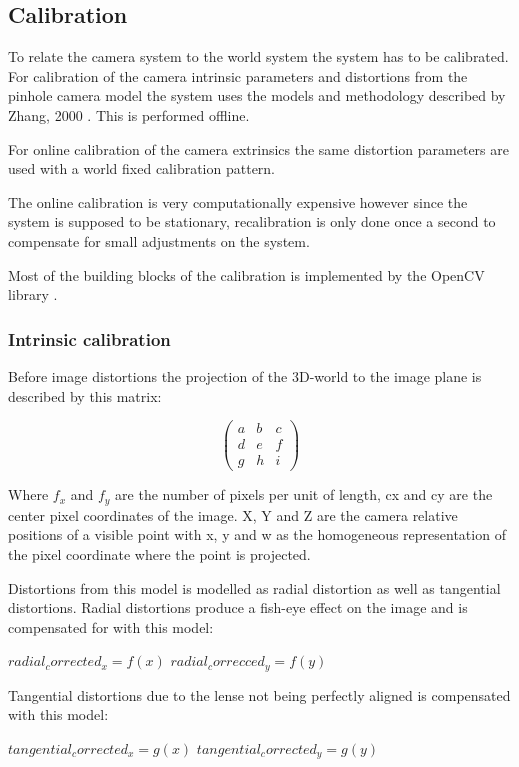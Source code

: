 
\subsection{Calibration}
To relate the camera system to the world system the system has to be calibrated. For calibration of the camera intrinsic parameters and distortions from the pinhole camera model the system uses the models and methodology described by Zhang, 2000 \cite{zhang}. This is performed offline.

For online calibration of the camera extrinsics the same distortion parameters are used with a world fixed calibration pattern.

The online calibration is very computationally expensive however since the system is supposed to be stationary, recalibration is only done once a second to compensate for small adjustments on the system.

Most of the building blocks of the calibration is implemented by the OpenCV library \cite{camcal}. 

\subsubsection{Intrinsic calibration}
Before image distortions the projection of the 3D-world to the image plane is described by this matrix:

\[ \left( \begin{array}{ccc}
a & b & c \\
d & e & f \\
g & h & i \end{array} \right)\] 

Where $f_x$ and $f_y$ are the number of pixels per unit of length, cx and cy are the center pixel coordinates of the image. X, Y and Z are the camera relative positions of a visible point with x, y and w as the homogeneous representation of the pixel coordinate where the point is projected.

Distortions from this model is modelled as radial distortion as well as tangential distortions. Radial distortions produce a fish-eye effect on the image and is compensated for with this model:

$radial_corrected_x = f(x)$
$radial_correcced_y = f(y)$

Tangential distortions due to the lense not being perfectly aligned is compensated with this model:

$tangential_corrected_x = g(x)$
$tangential_corrected_y = g(y)$

